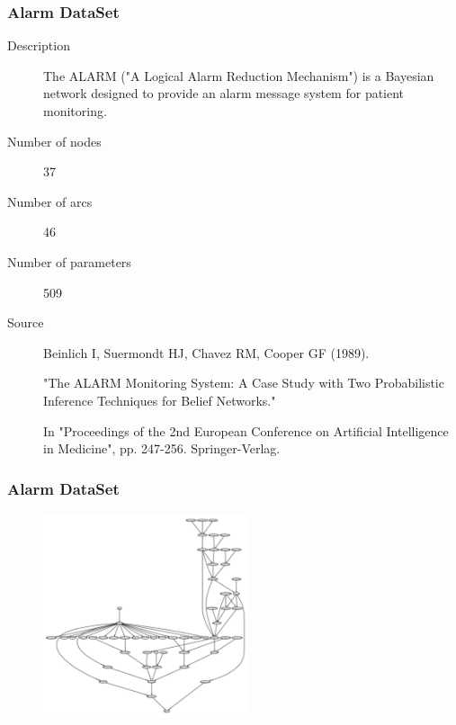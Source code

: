 \documentclass{beamer}
\begin{document}
\begin{frame}
\frametitle{Alarm DataSet}
{\scriptsize{}
\begin{description}
	\item[Description] The ALARM ("A Logical Alarm Reduction Mechanism") is a Bayesian network designed to provide an alarm message system for patient monitoring.
	
	\item[Number of nodes] 37
	
	\item[Number of arcs] 46
	
	\item[Number of parameters] 509
	
	\item[Source]  Beinlich I, Suermondt HJ, Chavez RM, Cooper GF (1989).
	
	"The ALARM Monitoring System: A Case Study with Two Probabilistic Inference Techniques for Belief Networks."
	
	In "Proceedings of the 2nd European Conference on Artificial Intelligence in Medicine", pp. 247-256. Springer-Verlag.
\end{description}
}
\end{frame}


\begin{frame}
\frametitle{Alarm DataSet}
{\scriptsize{}
	\begin{figure}
		\includegraphics[height=170pt]{images/Model_Real_ALARM}
	\end{figure}	
}
\end{frame}
\end{document}
